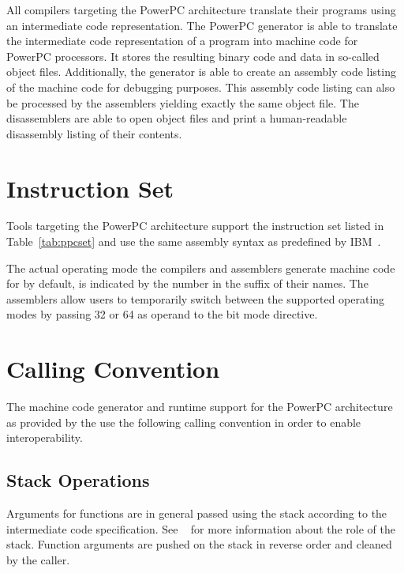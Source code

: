 All compilers targeting the PowerPC architecture translate their programs using an intermediate code representation.
The PowerPC generator is able to translate the intermediate code representation of a program into machine code for PowerPC processors.
It stores the resulting binary code and data in so-called object files.
Additionally, the generator is able to create an assembly code listing of the machine code for debugging purposes.
This assembly code listing can also be processed by the assemblers yielding exactly the same object file.
The disassemblers are able to open object files and print a human-readable disassembly listing of their contents.
\seeobject\seecode

\section{Instruction Set}

Tools targeting the PowerPC architecture support the instruction set listed in Table~\ref{tab:ppcset} and use the same assembly syntax as predefined by IBM~\cite{ppc:instructionset}.
\seeassembly


The actual operating mode the compilers and assemblers generate machine code for by default, is indicated by the number in the suffix of their names.
The assemblers allow users to temporarily switch between the supported operating modes by passing 32 or 64 as operand to the bit mode directive.

\section{Calling Convention}

The machine code generator and runtime support for the PowerPC architecture as provided by the \ecs{} use the following calling convention in order to enable interoperability.

\subsection{Stack Operations}

Arguments for functions are in general passed using the stack according to the intermediate code specification.
See \Documentation{}~ for more information about the role of the stack.
Function arguments are pushed on the stack in reverse order and cleaned by the caller.

